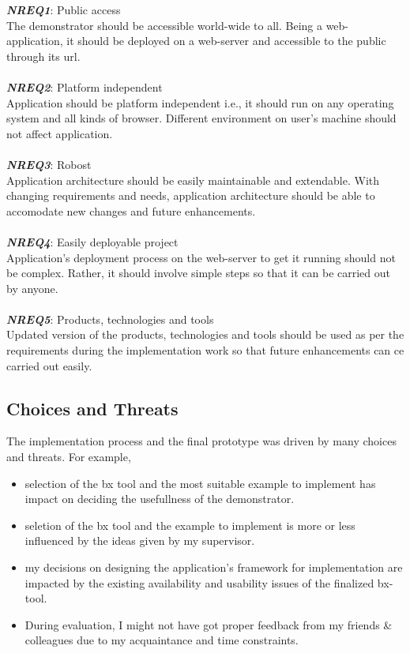 \textbf{\textit{NREQ1}}: Public access\\
The demonstrator should be accessible world-wide to all. Being a web-application, it should be deployed on a web-server and accessible to the public through its url.\\\\ 
\textbf{\textit{NREQ2}}: Platform independent\\ 
Application should be platform independent i.e., it should run on any operating system and all kinds of browser. Different environment on user's machine should not affect application.\\\\
\textbf{\textit{NREQ3}}: Robost\\
Application architecture should be easily maintainable and extendable. With changing requirements and needs, application architecture should be able to accomodate new changes and future enhancements.\\\\
\textbf{\textit{NREQ4}}: Easily deployable project\\
Application's deployment process on the web-server to get it running should not be complex. Rather, it should involve simple steps so that it can be carried out by anyone.\\\\
\textbf{\textit{NREQ5}}: Products, technologies and tools\\
Updated version of the products, technologies and tools should be used as per the requirements during the implementation work so that future enhancements can ce carried out easily.

\subsection{Choices and Threats}\label{subsec:choicesthreats}
The implementation process and the final prototype was driven by many choices and threats. For example, 
\begin{itemize} 
	\item {selection of the bx tool and the most suitable example to implement has impact on deciding the usefullness of the demonstrator.}
	\item {seletion of the bx tool and the example to implement is more or less influenced by the ideas given by my supervisor.} 
	\item {my decisions on designing the application's framework for implementation are impacted by the existing availability and usability issues of the finalized bx-tool.}
	\item {During evaluation, I might not have got proper feedback from my friends \& colleagues due to my acquaintance and time constraints.}
\end{itemize}











